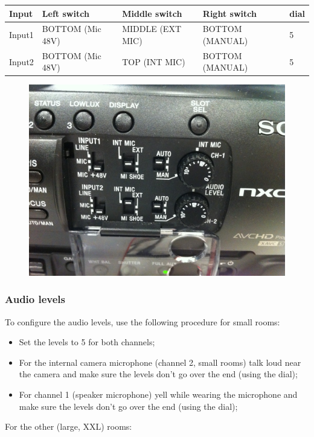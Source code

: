 \documentclass{article}
\begin{document}
\begin{tabular}{| l || l | l | l | l |}
\hline
Input & Left switch & Middle switch & Right switch & dial \\
\hline
Input1 & BOTTOM (Mic 48V) & MIDDLE (EXT MIC) & BOTTOM (MANUAL) & 5 \\
Input2 & BOTTOM (Mic 48V) & TOP (INT MIC) & BOTTOM (MANUAL) & 5 \\
\hline
\end{tabular}

\begin{figure}[H]
  \centering
\includegraphics[width = 120mm]{sony_audio_settings.jpg}
\end{figure}

\subsubsection{Audio levels}

To configure the audio levels, use the following procedure for small rooms:
\begin{itemize}
  \item Set the levels to 5 for both channels;
  \item For the internal camera microphone (channel 2, small rooms) talk loud near the camera and make sure the levels don't go over the end (using the dial);
  \item For channel 1 (speaker microphone) yell while wearing the microphone and make sure the levels don't go over the end (using the dial);
\end{itemize}

For the other (large, XXL) rooms:
\end{document}
